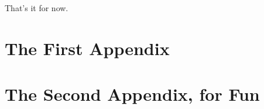 \documentclass[12pt,twoside]{reedthesis}
\theoremstyle{definition}
\theoremstyle{remark}
\theoremstyle{theorem}
\begin{document}
That's it for now.

\appendix
\chapter{The First Appendix}
\chapter{The Second Appendix, for Fun}



\backmatter %

\nocite{*}


% 


\end{document}
